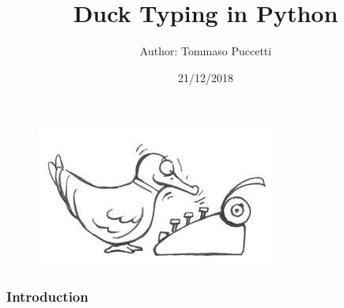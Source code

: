 \documentclass[xcolor ={table,usenames,dvipsnames}]{beamer}
\title{Duck Typing in Python}
\author{Author: Tommaso Puccetti}
\institute{Universit\`a  degli Studi di Firenze}
\date{21/12/2018}
\theoremstyle{definition}
\begin{document}
	
	\begin{frame}
		\maketitle
			\begin{figure}[h!]
			\centering
			\includegraphics[scale=2]{img/cartoonduck.jpg}
			\label{Interfacce di un CS}
		\end{figure}
	\end{frame}

	\begin{frame}
		\frametitle{Introduction}
	\end{frame}
	
\end{document}
